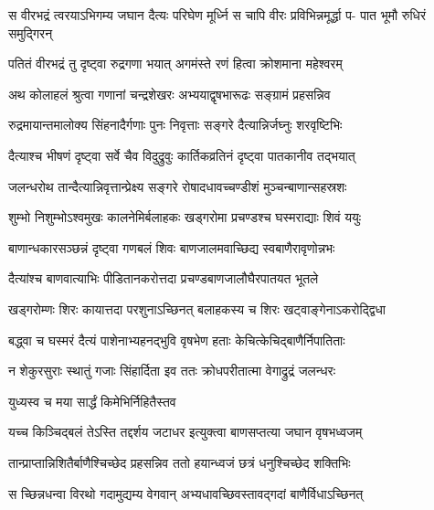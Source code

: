 \fourlineindentedshloka
{स वीरभद्रं त्वरयाऽभिगम्य}
{जघान दैत्यः परिघेण मूर्ध्नि}
{स चापि वीरः प्रविभिन्नमूर्द्धा प-}
{पात भूमौ रुधिरं समुद्गिरन्} %





\twolineshloka
{पतितं वीरभद्रं तु दृष्ट्वा रुद्रगणा भयात्}
{अगमंस्ते रणं हित्वा क्रोशमाना महेश्वरम्} %

\twolineshloka
{अथ कोलाहलं श्रुत्वा गणानां चन्द्रशेखरः}
{अभ्ययाद्वृषभारूढः सङ्ग्रामं प्रहसन्निव} %

\twolineshloka
{रुद्रमायान्तमालोक्य सिंहनादैर्गणाः पुनः}
{निवृत्ताः सङ्गरे दैत्यान्निर्जघ्नुः शरवृष्टिभिः} %

\twolineshloka
{दैत्याश्च भीषणं दृष्ट्वा सर्वे चैव विदुद्रुवुः}
{कार्तिकव्रतिनं दृष्ट्वा पातकानीव तद्भयात्} %

\twolineshloka
{जलन्धरोथ तान्दैत्यान्निवृत्तान्प्रेक्ष्य सङ्गरे}
{रोषादधावच्चण्डीशं मुञ्चन्बाणान्सहस्रशः} %

\twolineshloka
{शुम्भो निशुम्भोऽश्वमुखः कालनेमिर्बलाहकः}
{खड्गरोमा प्रचण्डश्च घस्मराद्याः शिवं ययुः} %

\twolineshloka
{बाणान्धकारसञ्छन्नं दृष्ट्वा गणबलं शिवः}
{बाणजालमवाच्छिद्य स्वबाणैरावृणोन्नभः} %

\twolineshloka
{दैत्यांश्च बाणवात्याभिः पीडितानकरोत्तदा}
{प्रचण्डबाणजालौघैरपातयत भूतले} %

\twolineshloka
{खड्गरोम्णः शिरः कायात्तदा परशुनाऽच्छिनत्}
{बलाहकस्य च शिरः खट्वाङ्गेनाऽकरोद्द्विधा} %

\twolineshloka
{बद्ध्वा च घस्मरं दैत्यं पाशेनाभ्यहनद्भुवि}
{वृषभेण हताः केचित्केचिद्बाणैर्निपातिताः} %

\twolineshloka
{न शेकुरसुराः स्थातुं गजाः सिंहार्दिता इव}
{ततः क्रोधपरीतात्मा वेगाद्रुद्रं जलन्धरः} %




\onelineshloka
{युध्यस्व च मया सार्द्धं किमेभिर्निहितैस्तव} %

\twolineshloka
{यच्च किञ्चिद्बलं तेऽस्ति तद्दर्शय जटाधर}
{इत्युक्त्वा बाणसप्तत्या जघान वृषभध्वजम्} %

\twolineshloka
{तान्प्राप्तान्निशितैर्बाणैश्चिच्छेद प्रहसन्निव}
{ततो हयान्ध्वजं छत्रं धनुश्चिच्छेद शक्तिभिः} %

\twolineshloka
{स च्छिन्नधन्वा विरथो गदामुद्यम्य वेगवान्}
{अभ्यधावच्छिवस्तावद्गदां बाणैर्विधाऽच्छिनत्} %

